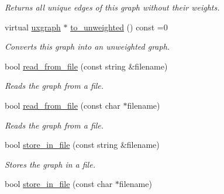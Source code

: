 \begin{DoxyCompactItemize}
\begin{DoxyCompactList}\small\item\em Returns all unique edges of this graph without their weights. \end{DoxyCompactList}\item 
virtual \hyperlink{classlgraph_1_1utils_1_1uxgraph}{uxgraph} $\ast$ \hyperlink{classlgraph_1_1utils_1_1wxgraph_a66d7a1fb48324c361d59dfa2d13db9eb}{to\+\_\+unweighted} () const =0
\begin{DoxyCompactList}\small\item\em Converts this graph into an unweighted graph. \end{DoxyCompactList}\item 
bool \hyperlink{classlgraph_1_1utils_1_1wxgraph_a329e674f9e3543f3347343470d82d404}{read\+\_\+from\+\_\+file} (const string \&filename)\hypertarget{classlgraph_1_1utils_1_1wxgraph_a329e674f9e3543f3347343470d82d404}{}\label{classlgraph_1_1utils_1_1wxgraph_a329e674f9e3543f3347343470d82d404}

\begin{DoxyCompactList}\small\item\em Reads the graph from a file. \end{DoxyCompactList}\item 
bool \hyperlink{classlgraph_1_1utils_1_1wxgraph_a74bb3ab0064749a8062c33a9213a233f}{read\+\_\+from\+\_\+file} (const char $\ast$filename)\hypertarget{classlgraph_1_1utils_1_1wxgraph_a74bb3ab0064749a8062c33a9213a233f}{}\label{classlgraph_1_1utils_1_1wxgraph_a74bb3ab0064749a8062c33a9213a233f}

\begin{DoxyCompactList}\small\item\em Reads the graph from a file. \end{DoxyCompactList}\item 
bool \hyperlink{classlgraph_1_1utils_1_1wxgraph_aff18a1cb62b8580956e8ddbb042e65e9}{store\+\_\+in\+\_\+file} (const string \&filename)\hypertarget{classlgraph_1_1utils_1_1wxgraph_aff18a1cb62b8580956e8ddbb042e65e9}{}\label{classlgraph_1_1utils_1_1wxgraph_aff18a1cb62b8580956e8ddbb042e65e9}

\begin{DoxyCompactList}\small\item\em Stores the graph in a file. \end{DoxyCompactList}\item 
bool \hyperlink{classlgraph_1_1utils_1_1wxgraph_aaa403d0b1dbca1e8e6d9cb30260e26df}{store\+\_\+in\+\_\+file} (const char $\ast$filename)\hypertarget{classlgraph_1_1utils_1_1wxgraph_aaa403d0b1dbca1e8e6d9cb30260e26df}{}\label{classlgraph_1_1utils_1_1wxgraph_aaa403d0b1dbca1e8e6d9cb30260e26df}


\end{DoxyCompactItemize}
